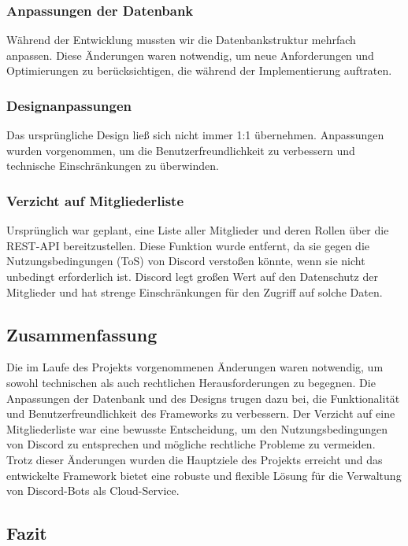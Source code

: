 \subsubsection*{Anpassungen der Datenbank}

Während der Entwicklung mussten wir die Datenbankstruktur mehrfach anpassen. Diese Änderungen waren notwendig, um neue Anforderungen und Optimierungen zu berücksichtigen, die während der Implementierung auftraten.

\subsubsection*{Designanpassungen}

Das ursprüngliche Design ließ sich nicht immer 1:1 übernehmen. Anpassungen wurden vorgenommen, um die Benutzerfreundlichkeit zu verbessern und technische Einschränkungen zu überwinden.

\subsubsection*{Verzicht auf Mitgliederliste}

Ursprünglich war geplant, eine Liste aller Mitglieder und deren Rollen über die REST-API bereitzustellen. Diese Funktion wurde entfernt, da sie gegen die Nutzungsbedingungen (ToS) von Discord verstoßen könnte, wenn sie nicht unbedingt erforderlich ist. Discord legt großen Wert auf den Datenschutz der Mitglieder und hat strenge Einschränkungen für den Zugriff auf solche Daten.

\subsection*{Zusammenfassung}

Die im Laufe des Projekts vorgenommenen Änderungen waren notwendig, um sowohl technischen als auch rechtlichen Herausforderungen zu begegnen. Die Anpassungen der Datenbank und des Designs trugen dazu bei, die Funktionalität und Benutzerfreundlichkeit des Frameworks zu verbessern. Der Verzicht auf eine Mitgliederliste war eine bewusste Entscheidung, um den Nutzungsbedingungen von Discord zu entsprechen und mögliche rechtliche Probleme zu vermeiden. Trotz dieser Änderungen wurden die Hauptziele des Projekts erreicht und das entwickelte Framework bietet eine robuste und flexible Lösung für die Verwaltung von Discord-Bots als Cloud-Service.

\subsection{Fazit}\label{fazit}

